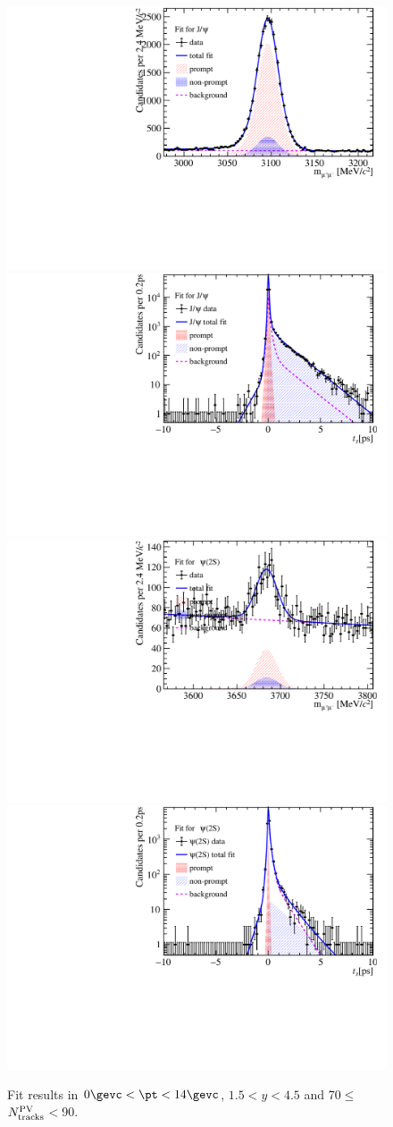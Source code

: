 \begin{figure}[H]
\begin{center}
\includegraphics[width=0.45\linewidth]{pdf/pPb/Workdir/TwoDimFit/ProjMass/Jpsi_n3y1pt1.pdf}
\includegraphics[width=0.45\linewidth]{pdf/pPb/Workdir/TwoDimFit/ProjTz/Jpsi_n3y1pt1.pdf}
\vspace*{-0.5cm}
\includegraphics[width=0.45\linewidth]{pdf/pPb/Workdir/TwoDimFit/ProjMass/Psi2S_n3y1pt1.pdf}
\includegraphics[width=0.45\linewidth]{pdf/pPb/Workdir/TwoDimFit/ProjTz/Psi2S_n3y1pt1.pdf}
\vspace*{-0.5cm}
\end{center}
\caption{Fit results in $0\gevc<\pt<14\gevc$, $1.5<y<4.5$ and 70$\leq$$N^{\rm PV}_{\rm tracks}$$<$90.}
\end{figure}

